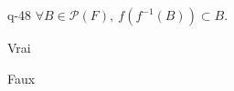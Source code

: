 \begin{truefalse}{q-48}
$\forall B\in\mathcal{P}(F),\ f(f^{-1}(B))\subset B$.
\item* Vrai
\item Faux
\end{truefalse}

